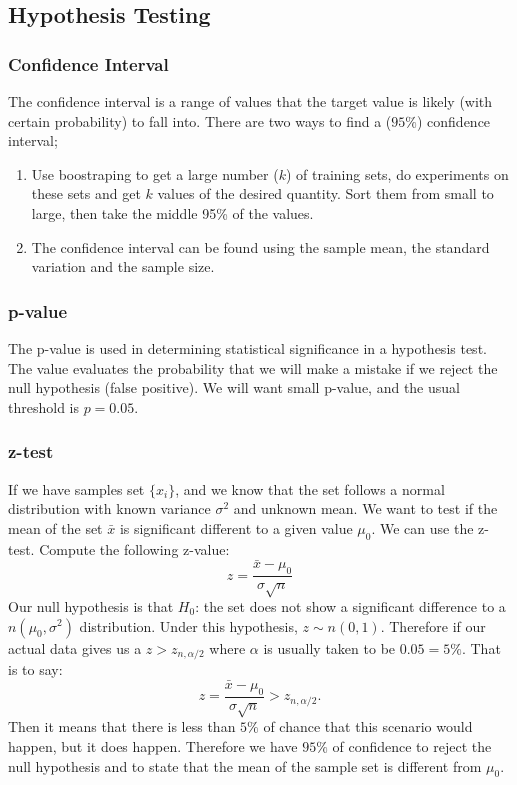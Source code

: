 \documentclass[12pt]{amsart}
\numberwithin{equation}{section}
\theoremstyle{plain}
\theoremstyle{definition}
\begin{document}
\subsection{Hypothesis Testing}
\subsubsection{Confidence Interval}
The confidence interval is a range of values that the target value is likely (with certain probability) to fall into. There are two ways to find a ($95\%$) confidence interval;
\begin{enumerate}
\item Use boostraping to get a large number ($k$) of training sets, do experiments on these sets and get $k$ values of the desired quantity. Sort them from small to large, then take the middle 95\% of the values.
\item The confidence interval can be found using the sample mean, the standard variation and the sample size.
\end{enumerate}
\subsubsection{p-value}
The p-value is used in determining statistical significance in a hypothesis test. The value evaluates the probability that we will make a mistake if we reject the null hypothesis (false positive). We will want small p-value, and the usual threshold is $p=0.05$.

\subsubsection{z-test} If we have samples set $\{x_i\}$, and we know that the set follows a normal distribution with known variance $\sigma^2$ and unknown mean. We want to test if the mean of the set $\bar x$ is significant different to a given value $\mu_0$. We can use the z-test. Compute the following z-value:
$$
z = \frac{\bar x-\mu_0}{\sigma\sqrt{n}}
$$
Our null hypothesis is that $H_0$: the set does not show a significant difference to a $n(\mu_0,\sigma^2)$ distribution. Under this hypothesis, $z\sim n(0,1)$. Therefore if our actual data gives us a $z>z_{n,\alpha/2}$ where $\alpha$ is usually taken to be $0.05 = 5\%$. That is to say:
$$
z = \frac{\bar x-\mu_0}{\sigma\sqrt{n}}>z_{n,\alpha/2}.
$$
Then it means that there is less than $5\%$ of chance that this scenario would happen, but it does happen. Therefore we have $95\%$ of confidence to reject the null hypothesis and to state that the mean of the sample set is different from $\mu_0$.
\end{document}
